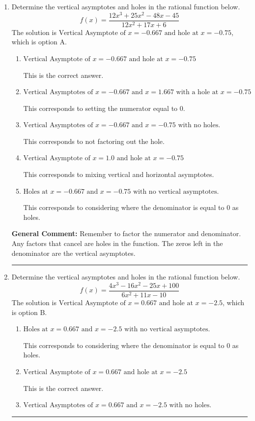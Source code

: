 \documentclass{extbook}[14pt]
\newcommand{\litem}[1]{\item #1

\rule{\textwidth}{0.4pt}}
\begin{document}
\begin{enumerate}\litem{
Determine the vertical asymptotes and holes in the rational function below.
\[ f(x) = \frac{12x^{3} +25 x^{2} -48 x -45}{12x^{2} +17 x + 6} \]The solution is \( \text{Vertical Asymptote of } x = -0.667 \text{ and hole at } x = -0.75 \), which is option A.\begin{enumerate}[label=\Alph*.]
\item \( \text{Vertical Asymptote of } x = -0.667 \text{ and hole at } x = -0.75 \)

This is the correct answer.
\item \( \text{Vertical Asymptotes of } x = -0.667 \text{ and } x = 1.667 \text{ with a hole at } x = -0.75 \)

This corresponds to setting the numerator equal to 0.
\item \( \text{Vertical Asymptotes of } x = -0.667 \text{ and } x = -0.75 \text{ with no holes.} \)

This corresponds to not factoring out the hole.
\item \( \text{Vertical Asymptote of } x = 1.0 \text{ and hole at } x = -0.75 \)

This corresponds to mixing vertical and horizontal asymptotes.
\item \( \text{Holes at } x = -0.667 \text{ and } x = -0.75 \text{ with no vertical asymptotes.} \)

This corresponds to considering where the denominator is equal to 0 as holes.
\end{enumerate}

\textbf{General Comment:} Remember to factor the numerator and denominator. Any factors that cancel are holes in the function. The zeros left in the denominator are the vertical asymptotes.
}
\litem{
Determine the vertical asymptotes and holes in the rational function below.
\[ f(x) = \frac{4x^{3} -16 x^{2} -25 x + 100}{6x^{2} +11 x -10} \]The solution is \( \text{Vertical Asymptote of } x = 0.667 \text{ and hole at } x = -2.5 \), which is option B.\begin{enumerate}[label=\Alph*.]
\item \( \text{Holes at } x = 0.667 \text{ and } x = -2.5 \text{ with no vertical asymptotes.} \)

This corresponds to considering where the denominator is equal to 0 as holes.
\item \( \text{Vertical Asymptote of } x = 0.667 \text{ and hole at } x = -2.5 \)

This is the correct answer.
\item \( \text{Vertical Asymptotes of } x = 0.667 \text{ and } x = -2.5 \text{ with no holes.} \)


\end{enumerate}}
\end{enumerate}
\end{document}
